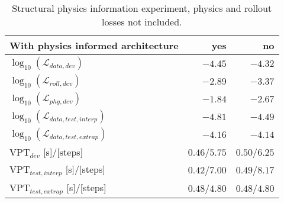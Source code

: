 \begin{table}[!b]
\centering
\caption{Structural physics information experiment, physics and rollout losses not included.}
\label{tab:position_rotated_no_pinn}
\begin{tabular}{l|r|r|}
\textbf{With physics informed architecture} & \textbf{yes}  & \textbf{no}   \\ \hline
$\log_{10}(\mathcal{L}_{data,dev})$         & $\bm{-4.45}$  & $-4.32$       \\ \hline
$\log_{10}(\mathcal{L}_{roll,dev})$         & $-2.89$       & $\bm{-3.37}$  \\ \hline
$\log_{10}(\mathcal{L}_{phy,dev})$          & $\bm{-1.84}$  & $-2.67$       \\ \hline
$\log_{10}(\mathcal{L}_{data,test,interp})$ & $\bm{-4.81}$  & $-4.49$       \\ \hline
$\log_{10}(\mathcal{L}_{data,test,extrap})$ & $\bm{-4.16}$  & $-4.14$       \\ \hline
$\text{VPT}_{dev}$ [s]/[steps]              & $0.46$/$5.75$ & $\bm{0.50}$/$6.25$ \\ \hline
$\text{VPT}_{test,interp}$ [s]/[steps]      & $0.42$/$7.00$ & $\bm{0.49}$/$8.17$ \\ \hline
$\text{VPT}_{test,extrap}$ [s]/[steps]      & $\bm{0.48}$/$4.80$ & $\bm{0.48}$/$4.80$
\end{tabular}
\end{table}